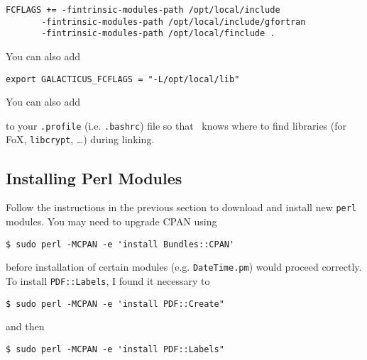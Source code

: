 \begin{verbatim}
FCFLAGS += -fintrinsic-modules-path /opt/local/include 
	   -fintrinsic-modules-path /opt/local/include/gfortran
	   -fintrinsic-modules-path /opt/local/finclude .
\end{verbatim}

You can also add

\begin{verbatim}
export GALACTICUS_FCFLAGS = "-L/opt/local/lib"
\end{verbatim}

You can also add

to your {\tt .profile} (i.e. {\tt .bashrc}) file so that \glc\ knows where to find libraries (for FoX, {\tt libcrypt}, \ldots) during linking.

\subsection{Installing Perl Modules}

Follow the instructions in the previous section to download and install new {\tt perl} modules. You may need to upgrade CPAN using

\begin{verbatim}
$ sudo perl -MCPAN -e 'install Bundles::CPAN'
\end{verbatim}

before installation of certain modules (e.g. {\tt DateTime.pm}) would proceed correctly. To install {\tt PDF::Labels}, I found it necessary to

\begin{verbatim}
$ sudo perl -MCPAN -e 'install PDF::Create"
\end{verbatim}

and then

\begin{verbatim}
$ sudo perl -MCPAN -e 'install PDF::Labels"
\end{verbatim}
